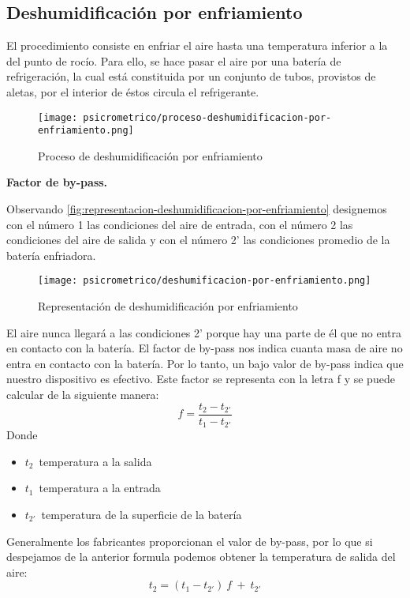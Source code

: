         \subsection{Deshumidificaci\'on por enfriamiento}

        El procedimiento consiste en enfriar el aire hasta una temperatura inferior a la del punto de roc\'io. Para ello, se hace pasar el aire por una bater\'ia de refrigeraci\'on, la cual est\'a constituida por un conjunto de tubos, provistos de aletas, por el interior de \'estos circula el refrigerante. 
         \begin{figure}[H]
             \centering
             \texttt{[image: psicrometrico/proceso-deshumidificacion-por-enfriamiento.png]}
             \caption{Proceso de deshumidificaci\'on por enfriamiento}
             \label{fig:proceso-deshumidificacion-por-enfriamiento}
         \end{figure}
        
        \textbf{Factor de by-pass.}
        
        Observando \autoref{fig:representacion-deshumidificacion-por-enfriamiento} designemos con el n\'umero 1 las condiciones del aire de entrada, con el n\'umero 2 las condiciones del aire de salida y con el n\'umero 2' las condiciones promedio de la bater\'ia enfriadora. 
         \begin{figure}[H]
             \centering
             \texttt{[image: psicrometrico/deshumificacion-por-enfriamiento.png]}
             \caption{Representaci\'on de deshumidificaci\'on por enfriamiento}
             \label{fig:representacion-deshumidificacion-por-enfriamiento}
         \end{figure}
        El aire nunca llegar\'a a las condiciones 2' porque hay una parte de \'el que no entra en contacto con la bater\'ia. El factor de by-pass nos indica cuanta masa de aire no entra en contacto con la bater\'ia. Por lo tanto, un bajo valor de by-pass indica que nuestro dispositivo es efectivo. Este factor se representa con la letra f y se puede calcular de la siguiente manera:
        \begin{equation*}
            f = \frac{t_2-t_{2'}}{t_1-t_{2'}}
        \end{equation*}
        Donde 
        \begin{itemize}
            \item $t_2$\ temperatura a la salida
            \item $t_1$\ temperatura a la entrada
            \item $t_{2'}$\ temperatura de la superficie de la bater\'ia
        \end{itemize}
        Generalmente los fabricantes proporcionan el valor de by-pass, por lo que si despejamos de la anterior formula podemos obtener la temperatura de salida del aire:
        \begin{equation}
            t_2 = (t_1-t_{2'})\ f\ +\ t_{2'}
            \label{eq:temperatura-suministro}
        \end{equation}

